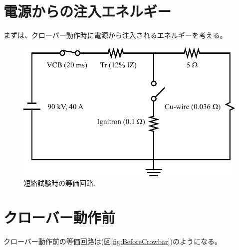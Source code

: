 \documentclass[book,openany]{jlreq}
\theoremstyle{definition}
\begin{document}
\section{電源からの注入エネルギー}
%
まずは、クローバー動作時に電源から注入されるエネルギーを考える。

\begin{figure}[htbp]
  \begin{center}
    \includegraphics[width=12cm]{figs/FromPS.pdf}
    \caption{短絡試験時の等価回路.}
    \label{fig:FromPS}
  \end{center}
\end{figure}

\clearpage

\section{クローバー動作前}

クローバー動作前の等価回路は(図\ref{fig:BeforeCrowbar})のようになる。
\end{document}
